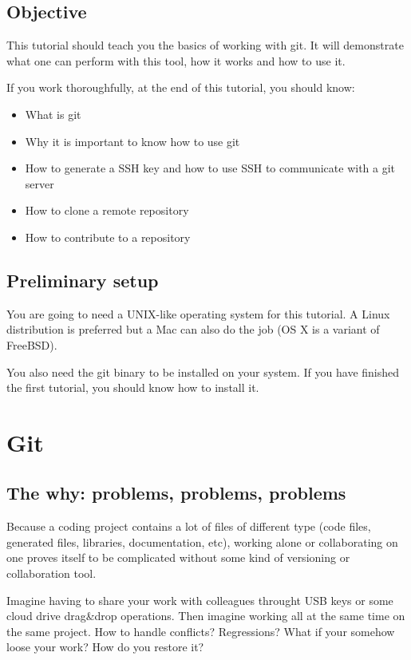 \documentclass[12pt]{article}
\begin{document}
\subsection{Objective}
This tutorial should teach you the basics of working with git.
It will demonstrate what one can perform with this tool, how it works and how to use it.

If you work thoroughfully, at the end of this tutorial, you should know:

\begin{itemize}
\item What is git
\item Why it is important to know how to use git
\item How to generate a SSH key and how to use SSH to communicate with a git server
\item How to clone a remote repository
\item How to contribute to a repository
\end{itemize}


\subsection{Preliminary setup}

You are going to need a UNIX-like operating system for this tutorial.
A Linux distribution is preferred but a Mac can also do the job (OS X is a variant of FreeBSD).

You also need the git binary to be installed on your system. If you have finished the first tutorial, you should know how to install it.


\section{Git}

\subsection{The why: problems, problems, problems}

Because a coding project contains a lot of files of different type (code files, generated files, libraries, documentation, etc), working alone or collaborating on one proves itself to be complicated without some kind of versioning or collaboration tool.

Imagine having to share your work with colleagues throught USB keys or some cloud drive drag\&drop operations. Then imagine working all at the same time on the same project. How to handle conflicts? Regressions? What if your somehow loose your work? How do you restore it?
\end{document}
